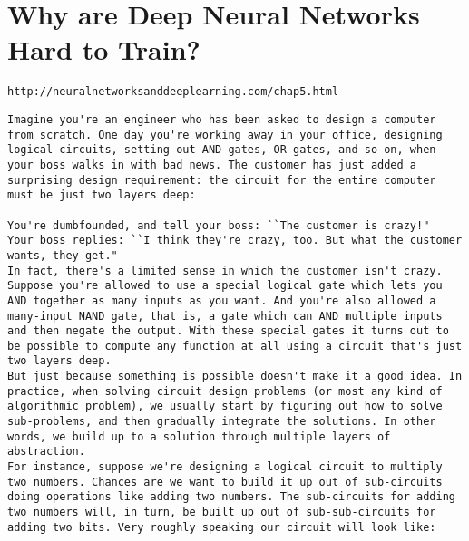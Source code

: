 \chapter{Why are Deep Neural Networks Hard to Train?}
\label{sec:WhyAreDeepNeuralNetworksHardToTrain?}


\lstinline{http://neuralnetworksanddeeplearning.com/chap5.html}





\begin{lstlisting}
Imagine you're an engineer who has been asked to design a computer from scratch. One day you're working away in your office, designing logical circuits, setting out AND gates, OR gates, and so on, when your boss walks in with bad news. The customer has just added a surprising design requirement: the circuit for the entire computer must be just two layers deep:

You're dumbfounded, and tell your boss: ``The customer is crazy!"
Your boss replies: ``I think they're crazy, too. But what the customer wants, they get."
In fact, there's a limited sense in which the customer isn't crazy. Suppose you're allowed to use a special logical gate which lets you AND together as many inputs as you want. And you're also allowed a many-input NAND gate, that is, a gate which can AND multiple inputs and then negate the output. With these special gates it turns out to be possible to compute any function at all using a circuit that's just two layers deep.
But just because something is possible doesn't make it a good idea. In practice, when solving circuit design problems (or most any kind of algorithmic problem), we usually start by figuring out how to solve sub-problems, and then gradually integrate the solutions. In other words, we build up to a solution through multiple layers of abstraction. 
For instance, suppose we're designing a logical circuit to multiply two numbers. Chances are we want to build it up out of sub-circuits doing operations like adding two numbers. The sub-circuits for adding two numbers will, in turn, be built up out of sub-sub-circuits for adding two bits. Very roughly speaking our circuit will look like:


\end{lstlisting}
